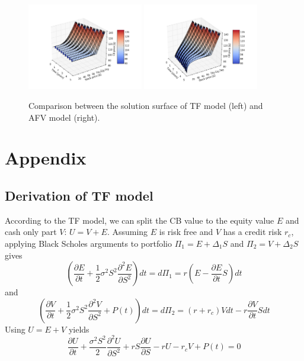 \documentclass[12pt]{article}
\begin{document}
\begin{figure}[!htbp]
\centering
\includegraphics[width=0.45\textwidth]{Figures/TF_model.png}
\includegraphics[width=0.45\textwidth]{Figures/AFV_model.png}
\caption{Comparison between the solution surface of TF model (left) and AFV model (right).}
\label{fig:AFV_TF}
\end{figure}

\section{Appendix}
\subsection{Derivation of TF model}
According to the TF model, we can split the CB value to the equity value $E$ and cash only part $V$: $U = V + E$. Assuming $E$ is risk free and $V$ has a credit risk $r_c$, applying Black Scholes arguments to portfolio $\Pi_1 = E + \Delta_1 S$ and $\Pi_2 = V + \Delta_2 S$ gives
\begin{equation*}
(\frac{\partial E}{\partial t} + \frac{1}{2}\sigma^2S^2\frac{\partial^2E}{\partial S^2})dt = d\Pi_1 = r(E - \frac{\partial E}{\partial t}S)dt
\end{equation*}
and
\begin{equation*}
(\frac{\partial V}{\partial t} + \frac{1}{2}\sigma^2S^2\frac{\partial^2V}{\partial S^2} + P(t))dt = d\Pi_2 = (r+r_c)Vdt - r\frac{\partial V}{\partial t}Sdt
\end{equation*}
Using $U = E + V$ yields
\begin{equation*}
\frac{\partial{U}}{\partial{t}} + 
\frac{\sigma^2S^2}{2}\frac{\partial^2{U}}{\partial{S}^2} + rS\frac{\partial{U}}{\partial{S}} - rU - r_cV + P(t) = 0 
\end{equation*}
\end{document}

